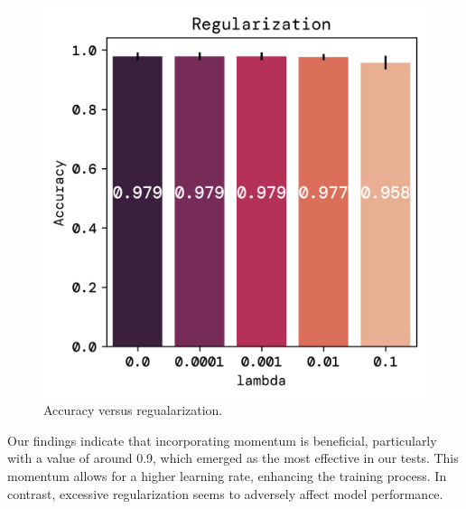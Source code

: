 \documentclass[twoside,11pt]{report}
\begin{document}
\begin{figure}[!ht]
\begin{minipage}[t]{0.5\textwidth - 1mm}
\begin{center}
                \includegraphics[width=\textwidth]{../runsAndFigures/accuracy_alpha.png}
            \end{center}
            \caption
            {
                Accuracy versus regualarization.
            }\label{fig:accuracy_aplha}
        \end{minipage}
    \end{figure}

    \noindent
    Our findings indicate that incorporating momentum is beneficial, particularly with a value of 
    around 0.9, which emerged as the most effective in our tests. This momentum allows for a higher learning rate, 
    enhancing the training process. In contrast, excessive regularization seems to adversely affect model performance.
    
\end{document}
